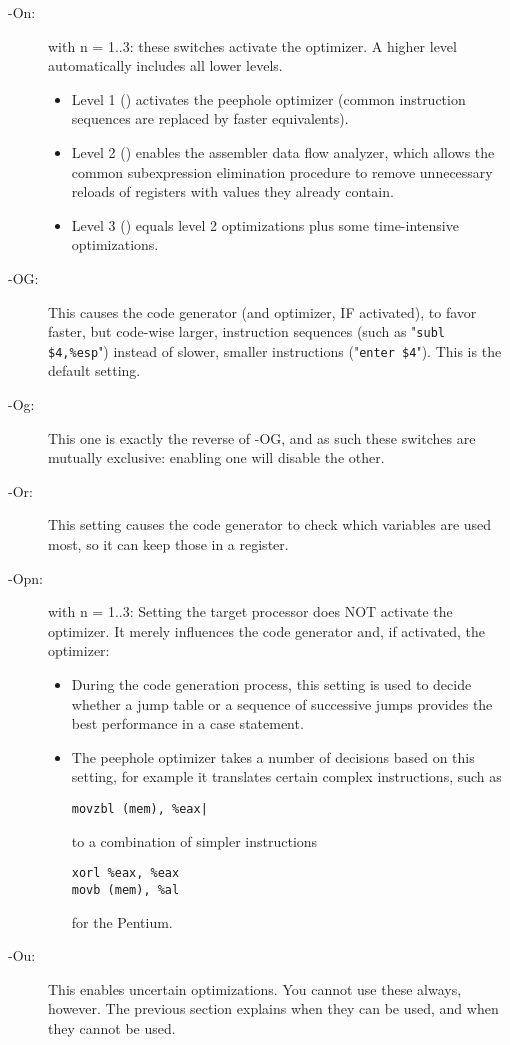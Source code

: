 \begin{description}
\item [-On:\ ] with n = 1..3: these switches activate the optimizer.
A higher level automatically includes all lower levels.
\begin{itemize}
\item Level 1 () activates the peephole optimizer
 (common instruction sequences are replaced by faster equivalents).
\item Level 2 () enables the assembler data flow analyzer,
which allows the common subexpression elimination procedure to
remove unnecessary reloads of registers with values they already contain.
\item Level 3 () equals level 2 optimizations plus some
time-intensive optimizations.
\end{itemize}
\item[-OG:\ ]
This causes the code generator (and optimizer, IF activated), to favor
faster, but code-wise larger, instruction sequences (such as
"\verb|subl $4,%esp|") instead of slower, smaller instructions
("\verb|enter $4|").  This is the default setting.

\item[-Og:\ ] This one is exactly the reverse of -OG, and as such these
switches are mutually exclusive: enabling one will disable the other.

\item[-Or:\ ] This setting causes the code generator to
check which variables are used most, so it can keep those in a register.

\item[-Opn:\ ] with n = 1..3: Setting the target processor does NOT
activate the optimizer. It merely influences the code generator and,
if activated, the optimizer:
\begin{itemize}
\item During the code generation process, this setting is used to
decide whether a jump table or a sequence of successive jumps provides
the best performance in a case statement.
\item The peephole optimizer takes a number of decisions based on this
setting, for example it translates certain complex instructions, such
as
\begin{verbatim}
movzbl (mem), %eax|
\end{verbatim}
to a combination of simpler instructions
\begin{verbatim}
xorl %eax, %eax
movb (mem), %al
\end{verbatim}
for the Pentium.
\end{itemize}
\item[-Ou:\ ] This enables uncertain optimizations. You cannot use these
always, however. The previous section explains when they can be used, and
when they cannot be used.
\end{description}


